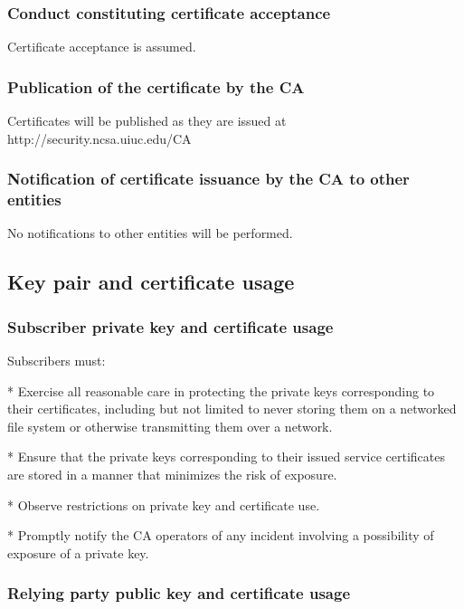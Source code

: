 \documentclass[10pt]{article}
\begin{document}
\subsubsection{Conduct constituting certificate acceptance}

Certificate acceptance is assumed.

\subsubsection{Publication of the certificate by the CA}

Certificates will be published as they are issued at
http://security.ncsa.uiuc.edu/CA

\subsubsection{Notification of certificate issuance by the CA to other entities}

No notifications to other entities will be performed.

\subsection{Key pair and certificate usage}

\subsubsection{Subscriber private key and certificate usage}

Subscribers must:

* Exercise all reasonable care in protecting the
private keys corresponding to their certificates, including but not
limited to never storing them on a networked file system or otherwise
transmitting them over a network.

* Ensure that the private keys corresponding to their issued service
certificates are stored in a manner that minimizes the risk of
exposure. 

* Observe restrictions on private key and certificate use. 

* Promptly notify the CA operators of any incident involving a
possibility of exposure of a private key. 

\subsubsection{Relying party public key and certificate usage}
\end{document}
